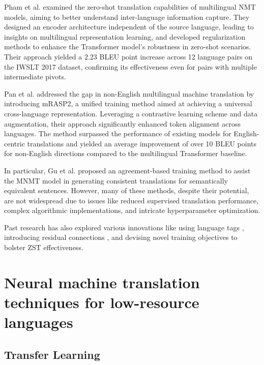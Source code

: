 \documentclass[acmsmall]{acmart}
\begin{document}
Pham et al. \cite{pham-etal-2019-improving} examined the zero-shot translation capabilities of multilingual NMT models, aiming to better understand inter-language information capture. They designed an encoder architecture independent of the source language, leading to insights on multilingual representation learning, and developed regularization methods to enhance the Transformer model's robustness in zero-shot scenarios. Their approach yielded a 2.23 BLEU point increase across 12 language pairs on the IWSLT 2017 dataset, confirming its effectiveness even for pairs with multiple intermediate pivots.

Pan et al. \cite{pan-etal-2021-contrastive} addressed the gap in non-English multilingual machine translation by introducing mRASP2, a unified training method aimed at achieving a universal cross-language representation. Leveraging a contrastive learning scheme and data augmentation, their approach significantly enhanced token alignment across languages. The method surpassed the performance of existing models for English-centric translations and yielded an average improvement of over 10 BLEU points for non-English directions compared to the multilingual Transformer baseline.

In particular, Gu et al. \cite{gu-feng-2022-improving} proposed an agreement-based training method to assist the MNMT model in generating consistent translations for semantically equivalent sentences. However, many of these methods, despite their potential, are not widespread due to issues like reduced supervised translation performance, complex algorithmic implementations, and intricate hyperparameter optimization.

Past research has also explored various innovations like using language tags \cite{wu-etal-2021-language}, introducing residual connections \cite{liu-etal-2021-improving-zero}, and devising novel training objectives \cite{al-shedivat-parikh-2019-consistency, pham-etal-2019-improving, abs-1903-07091, gu-etal-2019-improved, zhu-etal-2020-language, zhang-etal-2020-improving, wang-etal-2021-rethinking-zero} to bolster ZST effectiveness.


\section{Neural machine translation techniques for low-resource languages}


\subsection{Transfer Learning}
\end{document}
